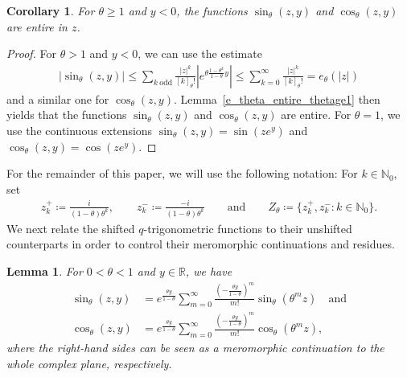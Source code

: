 \documentclass[12pt]{article}
\newcommand{\N}{\mathbb{N}} %
\newcommand{\R}{\mathbb{R}} %
\newcommand{\1}{\mathds{1}}
\theoremstyle{definition}
\theoremstyle{plain}
\newtheorem{Lemma}[definition]{Lemma}
\newtheorem{Corollary}[definition]{Corollary}
\theoremstyle{remark}
\begin{document}
 \begin{Corollary}\label{sine_and_cose_prelim}
      For $\theta\ge1$ and $y<0$, the functions $\sin_\theta(z,y)$ and $\cos_\theta(z,y)$ are entire in $z$.
 \end{Corollary}
 \begin{proof}
    For $\theta>1$ and $y<0$, we can use the estimate
\begin{align*}
    |\sin_{\theta}(z, y)|\leq \sum_{k~\text{odd}}\frac{|z|^{k}}{[k]_{\theta}!}|e^{\theta\frac{1-\theta^{k}}{1-\theta} y}|\leq \sum_{k=0}^\infty\frac{|z|^{k}}{[k]_{\theta}!}=e_\theta(|z|)
\end{align*}
and a similar one for $\cos_{\theta}(z,y)$. Lemma~\ref{e_theta_entire_thetage1} then yields that the functions $\sin_\theta(z,y)$ and $\cos_\theta(z,y)$ are entire. For $\theta=1$, we use the continuous extensions $\sin_{\theta}(z, y)=\sin(ze^y)$ and $\cos_{\theta}(z, y)=\cos(ze^y)$.
 \end{proof}
For the remainder of this paper, we will use the following notation: For $k\in\N_0$, set
   \begin{align}\label{def_zk}
       z_k^+\coloneqq \frac{i}{(1-\theta)\theta^k},\qquad z_k^-\coloneqq \frac{-i}{(1-\theta)\theta^k}\qquad\text{and}\qquad Z_\theta\coloneqq \{z_k^+,z_k^-:k\in\N_0\}.
   \end{align}
   We next relate the shifted $q$-trigonometric functions to their unshifted counterparts in order to control their meromorphic continuations and residues.
 \begin{Lemma}\label{sin_e_and_cos_e_prelim}
    For $0<\theta<1$ and $y\in\R$, we have
     \begin{align}
         \sin_\theta(z,y)&=e^{\frac{\theta y}{1-\theta}}\sum_{m=0}^\infty\frac{\left(-\frac{\theta y}{1-\theta}\right)^m}{m!}\sin_\theta(\theta^m z)\quad\text{and}\label{meromorhpic_sin}
         \\\cos_\theta(z,y)&=e^{\frac{\theta y}{1-\theta}}\sum_{m=0}^\infty\frac{\left(-\frac{\theta y}{1-\theta}\right)^m}{m!}\cos_\theta(\theta^m z),\label{meromorhpic_cos}
     \end{align}
     where the right-hand sides can be seen as a meromorphic continuation to the whole complex plane, respectively.
 \end{Lemma}
\end{document}
